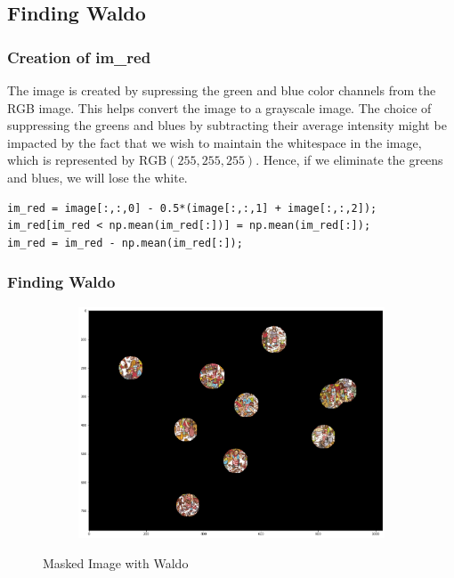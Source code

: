 \documentclass[12pt, oneside]{article}
\begin{document}
\subsection{Finding Waldo}

\subsubsection{Creation of im\_red}
The image is created by supressing the green and blue color channels from the RGB image. This helps convert the image to a grayscale image. The choice of suppressing the greens and blues by subtracting their average intensity might be impacted by the fact that we wish to maintain the whitespace in the image, which is represented by $\text{RGB}(255, 255, 255)$. Hence, if we eliminate the greens and blues, we will lose the white.

\begin{verbatim}
im_red = image[:,:,0] - 0.5*(image[:,:,1] + image[:,:,2]);
im_red[im_red < np.mean(im_red[:])] = np.mean(im_red[:]);
im_red = im_red - np.mean(im_red[:]);
\end{verbatim}

\subsubsection{Finding Waldo}

\begin{figure}[H]
    \centering
    \begin{subfigure}[b]{1\textwidth}
        \centering
        \includegraphics[width=\textwidth]{imgs/q2.2_plot.png}
    \end{subfigure}
    \caption{Masked Image with Waldo}
\end{figure}
\end{document}
